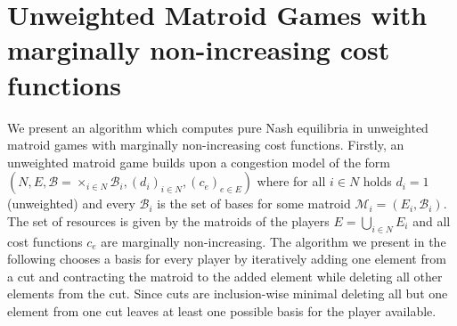 \documentclass{scrartcl}
\theoremstyle{nonumberplain}
\newcommand{\tupel}[1]{\left(#1\right)}
\begin{document}
\section{Unweighted Matroid Games with marginally non-increasing cost
functions}
We present an algorithm which computes pure Nash equilibria in unweighted
matroid games with marginally non-increasing cost functions. Firstly, an
unweighted matroid game builds upon a congestion model of the form
$\tupel{N, E, \mathcal{B} = \times_{i\in N}\mathcal{B}_{i},
(d_{i})_{i\in N}, (c_{e})_{e\in E}}$ where for all $i\in N$ holds $d_{i} = 1$
(unweighted) and every $\mathcal{B}_{i}$ is the set of bases for some matroid
$\mathcal{M}_{i} = \tupel{E_{i}, \mathcal{B}_{i}}$. The set of resources is
given by the matroids of the players $E = \bigcup_{i\in N}E_{i}$ and all cost
functions $c_{e}$ are marginally non-increasing. The algorithm
we present in the following chooses a basis for every player by iteratively
adding one element from a cut and contracting the matroid to the added element
while deleting all other elements from the cut. Since cuts are inclusion-wise
minimal deleting all but one element from one cut leaves at least one possible
basis for the player available.


\todos
\end{document}
